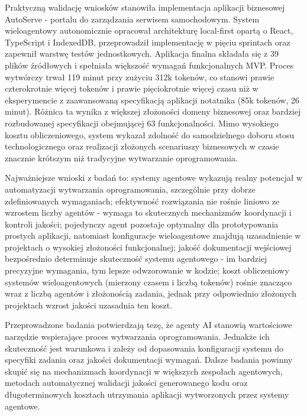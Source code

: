 \documentclass[
    left=2.5cm,         %
    right=2.5cm,        %
    top=2.5cm,          %
    bottom=3cm,         %
    bindingoffset=6mm,  %
    nohyphenation=false %
]{ee/ee-thesis}
\begin{document}
Praktyczną walidację wniosków stanowiła implementacja aplikacji biznesowej AutoServe - portalu do zarządzania serwisem samochodowym. System wieloagentowy autonomicznie opracował architekturę local-first opartą o React, TypeScript i IndexedDB, przeprowadził implementację w pięciu sprintach oraz zapewnił warstwę testów jednostkowych. Aplikacja finalna składała się z 39 plików źródłowych i spełniała większość wymagań funkcjonalnych MVP. Proces wytwórczy trwał 119 minut przy zużyciu 312k tokenów, co stanowi prawie czterokrotnie więcej tokenów i prawie pięciokrotnie więcej czasu niż w eksperymencie z zaawansowaną specyfikacją aplikacji notatnika (85k tokenów, 26 minut). Różnica ta wynika z większej złożoności domeny biznesowej oraz bardziej rozbudowanej specyfikacji obejmującej 63 funkcjonalności. Mimo wysokiego kosztu obliczeniowego, system wykazał zdolność do samodzielnego doboru stosu technologicznego oraz realizacji złożonych scenariuszy biznesowych w czasie znacznie krótszym niż tradycyjne wytwarzanie oprogramowania.

Najważniejsze wnioski z badań to: systemy agentowe wykazują realny potencjał w automatyzacji wytwarzania oprogramowania, szczególnie przy dobrze zdefiniowanych wymaganiach; efektywność rozwiązania nie rośnie liniowo ze wzrostem liczby agentów - wymaga to skutecznych mechanizmów koordynacji i kontroli jakości; pojedynczy agent pozostaje optymalny dla prototypowania prostych aplikacji, natomiast konfiguracje wieloagentowe znajdują uzasadnienie w projektach o wysokiej złożoności funkcjonalnej; jakość dokumentacji wejściowej bezpośrednio determinuje skuteczność systemu agentowego - im bardziej precyzyjne wymagania, tym lepsze odwzorowanie w kodzie; koszt obliczeniowy systemów wieloagentowych (mierzony czasem i liczbą tokenów) rośnie znacząco wraz z liczbą agentów i złożonością zadania, jednak przy odpowiednio złożonych projektach wzrost jakości uzasadnia ten koszt.

Przeprowadzone badania potwierdzają tezę, że agenty AI stanowią wartościowe narzędzie wspierające proces wytwarzania oprogramowania. Jednakże ich skuteczność jest warunkowa i zależy od dopasowania konfiguracji systemu do specyfiki zadania oraz jakości dokumentacji wymagań. Dalsze badania powinny skupić się na mechanizmach koordynacji w większych zespołach agentowych, metodach automatycznej walidacji jakości generowanego kodu oraz długoterminowych kosztach utrzymania aplikacji wytworzonych przez systemy agentowe.


\newpage

\cleardoublepage
\printbibliography
\end{document}
